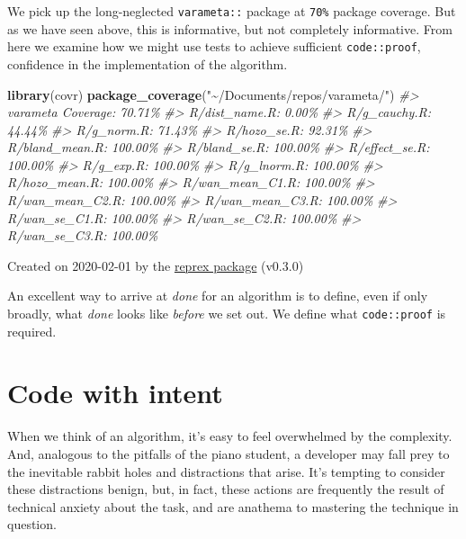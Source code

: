\documentclass[
]{article}
\newenvironment{Shaded}{\begin{snugshade}}{\end{snugshade}}
\newcommand{\CommentTok}[1]{\textcolor[rgb]{0.56,0.35,0.01}{\textit{#1}}}
\newcommand{\KeywordTok}[1]{\textcolor[rgb]{0.13,0.29,0.53}{\textbf{#1}}}
\newcommand{\NormalTok}[1]{#1}
\newcommand{\StringTok}[1]{\textcolor[rgb]{0.31,0.60,0.02}{#1}}
\begin{document}
We pick up the long-neglected \texttt{varameta::} package at
\texttt{70\%} package coverage. But as we have seen above, this is
informative, but not completely informative. From here we examine how we
might use tests to achieve sufficient \texttt{code::proof}, confidence
in the implementation of the algorithm.

\begin{Shaded}
\begin{Highlighting}[]
\KeywordTok{library}\NormalTok{(covr)}
\KeywordTok{package\_coverage}\NormalTok{(}\StringTok{"\textasciitilde{}/Documents/repos/varameta/"}\NormalTok{)}
\CommentTok{\#> varameta Coverage: 70.71\%}
\CommentTok{\#> R/dist\_name.R: 0.00\%}
\CommentTok{\#> R/g\_cauchy.R: 44.44\%}
\CommentTok{\#> R/g\_norm.R: 71.43\%}
\CommentTok{\#> R/hozo\_se.R: 92.31\%}
\CommentTok{\#> R/bland\_mean.R: 100.00\%}
\CommentTok{\#> R/bland\_se.R: 100.00\%}
\CommentTok{\#> R/effect\_se.R: 100.00\%}
\CommentTok{\#> R/g\_exp.R: 100.00\%}
\CommentTok{\#> R/g\_lnorm.R: 100.00\%}
\CommentTok{\#> R/hozo\_mean.R: 100.00\%}
\CommentTok{\#> R/wan\_mean\_C1.R: 100.00\%}
\CommentTok{\#> R/wan\_mean\_C2.R: 100.00\%}
\CommentTok{\#> R/wan\_mean\_C3.R: 100.00\%}
\CommentTok{\#> R/wan\_se\_C1.R: 100.00\%}
\CommentTok{\#> R/wan\_se\_C2.R: 100.00\%}
\CommentTok{\#> R/wan\_se\_C3.R: 100.00\%}
\end{Highlighting}
\end{Shaded}

Created on 2020-02-01 by the \href{https://reprex.tidyverse.org}{reprex
package} (v0.3.0)

An excellent way to arrive at \emph{done} for an algorithm is to define,
even if only broadly, what \emph{done} looks like \emph{before} we set
out. We define what \texttt{code::proof} is required.

\hypertarget{code-with-intent}{%
\section{Code with intent}\label{code-with-intent}}

When we think of an algorithm, it's easy to feel overwhelmed by the
complexity. And, analogous to the pitfalls of the piano student, a
developer may fall prey to the inevitable rabbit holes and distractions
that arise. It's tempting to consider these distractions benign, but, in
fact, these actions are frequently the result of technical anxiety about
the task, and are anathema to mastering the technique in question.
\end{document}

